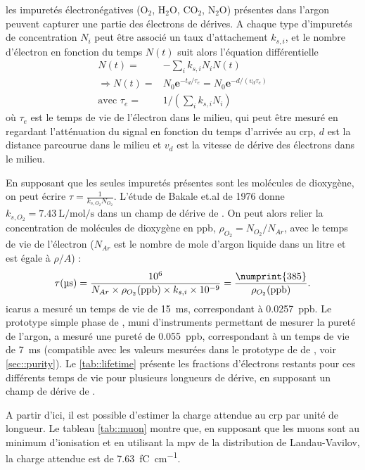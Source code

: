         les impuretés électronégatives (O$_2$, H$_2$O, CO$_2$, N$_2$O) présentes dans l'argon peuvent capturer une partie des électrons de dérives. A chaque type d'impuretés de concentration $N_i$ peut être associé un taux d'attachement $k_{s,i}$, et le nombre d'électron en fonction du temps $N(t)$ suit alors l'équation différentielle\cite{Buckley1989}
        \begin{eqnarray}
          N(t) = & -\sum_{i} k_{s,i}N_i N(t)\\
          \Rightarrow N(t) = & N_0\textbf{e}^{-t_d/\tau_e}=N_0\textbf{e}^{-d/(v_d\tau_e)}\label{eq::losses} \\
          \text{avec } \tau_e = & 1/(\sum_{i} k_{s,i}N_i)
        \end{eqnarray}
        où $\tau_e$ est le temps de vie de l'électron dans le milieu, qui peut être mesuré en regardant l'atténuation du signal en fonction du temps d'arrivée au \gls{crp}, $d$ est la distance parcourue dans le milieu et $v_d$ est la vitesse de dérive des électrons dans le milieu.

        En supposant que les seules impuretés présentes sont les molécules de dioxygène, on peut écrire $\tau = \frac{1}{k_{s,O_2} N_{O_2}}$. L'étude de Bakale et.al de 1976\cite{Bakale1976} donne $k_{s,O_2}=\SI{7.43}{\liter\per\mole\per\second}$ dans un champ de dérive de \driftfield{}. On peut alors relier la concentration de molécules de dioxygène en ppb, $\rho_{O_2}=N_{O_2}/N_{Ar}$, avec le temps de vie de l'électron ($N_{Ar}$ est le nombre de mole d'argon liquide dans un litre et est égale à $\rho/A$) : 
        \begin{equation}
          \tau(\si{\micro\second}) = \frac{10^6}{N_{Ar}\times \rho_{O_2}(\si{ppb}) \times k_{s,i} \times 10^{-9}} = \frac{\numprint{385}}{\rho_{O_2}(\si{ppb})}\label{eq::purity}.
        \end{equation}
        \gls{icarus} a mesuré un temps de vie de \SI{15}{\milli\second}\cite{Antonello2014}, correspondant à \SI{0.0257}{ppb}. Le prototype simple phase de \protosp{}, muni d'instruments permettant de mesurer la pureté de l'argon, a mesuré une pureté de \SI{0.055}{ppb}, correspondant à un temps de vie de \SI{7}{\milli\second} (compatible avec les valeurs mesurées dans le prototype de \TOO{} de \protodp{}, voir \autoref{sec::purity}). Le \autoref{tab::lifetime} présente les fractions d'électrons restants pour ces différents temps de vie pour plusieurs longueurs de dérive, en supposant un champ de dérive de \driftfield{}.

        A partir d'ici, il est possible d'estimer la charge attendue au \gls{crp} par unité de longueur. Le tableau \autoref{tab::muon} montre que, en supposant que les muons sont au minimum d'ionisation et en utilisant la \gls{mpv} de la distribution de Landau-Vavilov, la charge attendue est de \SI{7.63}{\femto\coulomb\per\centi\meter}.

